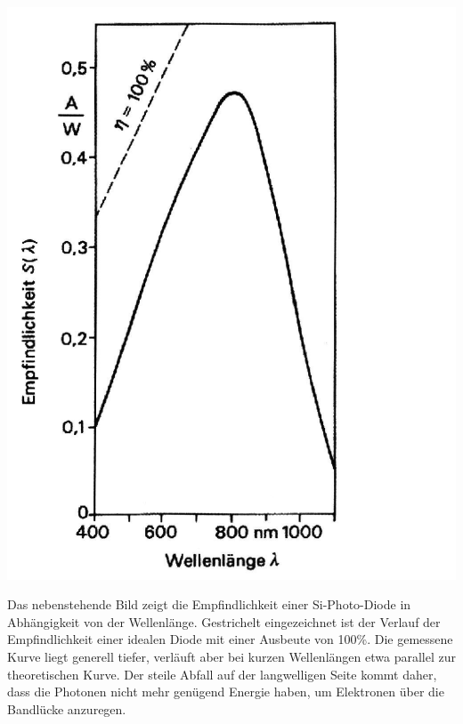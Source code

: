 \begin{minipage}{0.5\textwidth}
	\includegraphics[width=1.00\textwidth]{Abbildungen/QE_Solarzelle.JPG}
	\label{fig:BILD17}
\end{minipage}
\begin{minipage}{0.5\textwidth}
Das nebenstehende Bild zeigt die Empfindlichkeit einer Si-Photo-Diode in Abhängigkeit von der Wellenlänge. Gestrichelt eingezeichnet ist der Verlauf der Empfindlichkeit einer idealen Diode mit einer Ausbeute von 100\%.
Die gemessene Kurve liegt generell tiefer, verläuft aber bei kurzen Wellenlängen etwa parallel zur theoretischen Kurve.
Der steile Abfall auf der langwelligen Seite kommt daher, dass die Photonen nicht mehr genügend Energie haben, um Elektronen über die Bandlücke anzuregen.
\end{minipage}